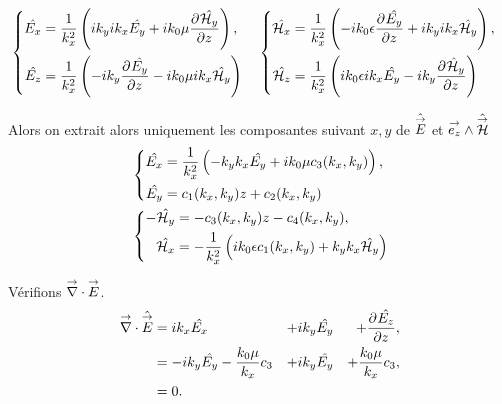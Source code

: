   \begin{align*}
  &\left\lbrace
    \begin{aligned}
      \hat{E_x} &= \frac{1}{k_x^2}\left(ik_yik_x\hat{E_y} + ik_0\mu\ddr{z}{\hat{\cH_y}}\right),
      \\
      \hat{E_z} &= \frac{1}{k_x^2}\left(-ik_y\ddr{z}{\hat{E_y}}-ik_0\mu ik_x\hat{\cH_y}\right)
    \end{aligned}
  \right.    
  &&
  \left\lbrace
    \begin{aligned}
      \hat{\cH_x} &= \frac{1}{k_x^2}\left(-ik_0\eps\ddr{z}{\hat{E_y}} + ik_yik_x\hat{\cH_y}\right),
      \\
      \hat{\cH_z} &= \frac{1}{k_x^2}\left(ik_0\eps ik_x \hat{E_y} - ik_y \ddr{z}{\hat{\cH}_y} \right)
    \end{aligned}
    \right.
  \end{align*}

  Alors on extrait alors uniquement les composantes suivant \(x,y\) de \(\hat{\vE}\) et \(\vect{e_z} \pvect \hat{\vH}\)
  \begin{align*}
  &\left\lbrace
    \begin{aligned}
      \hat{E_x} &= \frac{1}{k_x^2}\left(-k_yk_x\hat{E_y} + ik_0\mu c_3(k_x,k_y)\right),
      \\
      \hat{E_y} &= c_1(k_x,k_y)z + c_2(k_x,k_y)
    \end{aligned}
  \right.    
  \\&
  \left\lbrace
    \begin{aligned}
      -\hat{\cH_y} &= -c_3(k_x,k_y)z - c_4(k_x,k_y),
      \\
      \hat{\cH_x} &= -\frac{1}{k_x^2}\left(ik_0\eps c_1(k_x,k_y) + k_yk_x\hat{\cH_y}\right)
    \end{aligned}
    \right.
  \end{align*}

  Vérifions \(\vdiv\vE\).
  \begin{align*}
    \vdiv{\hat{\vE}} &= ik_x\hat{E_x} &+ ik_y\hat{E_y} &&+ \ddr{z}{\hat{E_z}},
    \\
    &= -ik_y\hat{E_y} - \frac{k_0\mu}{k_x}c_3 &+ ik_y \hat{E_y} &&+ \frac{k_0\mu}{k_x}c_3,
    \\
    &= 0.
  \end{align*}

